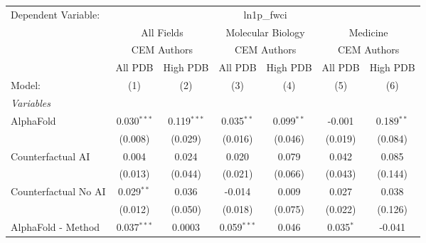 \begingroup
\centering
\begin{tabular}{lcccccc}
   \tabularnewline \midrule \midrule
   Dependent Variable: & \multicolumn{6}{c}{ln1p\_fwci}\\
 & \multicolumn{2}{c}{All Fields} & \multicolumn{2}{c}{Molecular Biology} & \multicolumn{2}{c}{Medicine} \\
\cmidrule(lr){2-3} \cmidrule(lr){4-5} \cmidrule(lr){6-7}
 & \multicolumn{2}{c}{CEM Authors} & \multicolumn{2}{c}{CEM Authors} & \multicolumn{2}{c}{CEM Authors} \\
\cmidrule(lr){2-3} \cmidrule(lr){4-5} \cmidrule(lr){6-7}
 & \multicolumn{1}{c}{All PDB} & \multicolumn{1}{c}{High PDB} & \multicolumn{1}{c}{All PDB} & \multicolumn{1}{c}{High PDB} & \multicolumn{1}{c}{All PDB} & \multicolumn{1}{c}{High PDB} \\
\cmidrule(lr){2-2} \cmidrule(lr){3-3} \cmidrule(lr){4-4} \cmidrule(lr){5-5} \cmidrule(lr){6-6} \cmidrule(lr){7-7}
   Model:                                                     & (1)           & (2)           & (3)           & (4)          & (5)           & (6)\\  
   \midrule
   \emph{Variables}\\
   AlphaFold                                                  & 0.030$^{***}$ & 0.119$^{***}$ & 0.035$^{**}$  & 0.099$^{**}$ & -0.001        & 0.189$^{**}$\\   
                                                              & (0.008)       & (0.029)       & (0.016)       & (0.046)      & (0.019)       & (0.084)\\   
   Counterfactual AI                                          & 0.004         & 0.024         & 0.020         & 0.079        & 0.042         & 0.085\\   
                                                              & (0.013)       & (0.044)       & (0.021)       & (0.066)      & (0.043)       & (0.144)\\   
   Counterfactual No AI                                       & 0.029$^{**}$  & 0.036         & -0.014        & 0.009        & 0.027         & 0.038\\   
                                                              & (0.012)       & (0.050)       & (0.018)       & (0.075)      & (0.022)       & (0.126)\\   
   AlphaFold - Method                                         & 0.037$^{***}$ & 0.0003        & 0.059$^{***}$ & 0.046        & 0.035$^{*}$   & -0.041\\   

\end{tabular}
